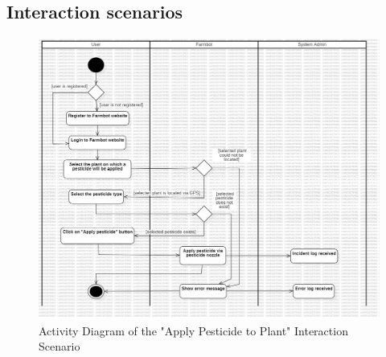 \subsection{Interaction scenarios}
\begin{figure}[htbp]
    \centering
    \includegraphics[width=1\linewidth]{Figures/activity1.jpg}
    \caption{Activity Diagram of the "Apply Pesticide to Plant" Interaction Scenario}
    \label{Activity1}
\end{figure}

